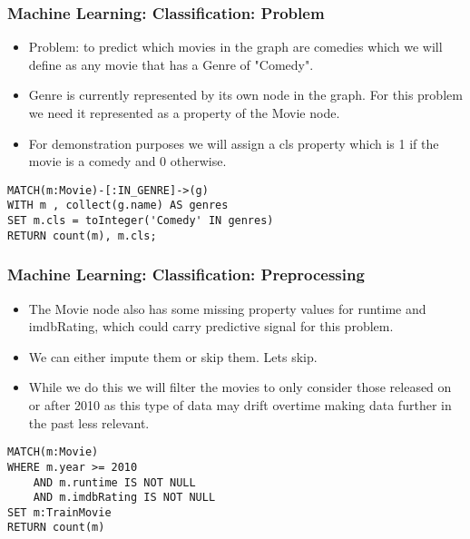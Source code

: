 \begin{frame}[fragile]\frametitle{Machine Learning: Classification: Problem}

\begin{itemize}
\item Problem: to predict which movies in the graph are comedies which we will define as any movie that has a Genre of "Comedy".
\item Genre is currently represented by its own node in the graph. For this problem we need it represented as a property of the Movie node. 
\item For demonstration purposes we will assign a cls property which is 1 if the movie is a comedy and 0 otherwise.
\end{itemize}

\begin{lstlisting}
MATCH(m:Movie)-[:IN_GENRE]->(g)
WITH m , collect(g.name) AS genres
SET m.cls = toInteger('Comedy' IN genres)
RETURN count(m), m.cls;
\end{lstlisting}
\end{frame}

\begin{frame}[fragile]\frametitle{Machine Learning: Classification: Preprocessing}

\begin{itemize}
\item The Movie node also has some missing property values for runtime and imdbRating, which could carry predictive signal for this problem.
\item We can either impute them or skip them. Lets skip.
\item While we do this we will filter the movies to only consider those released on or after 2010 as this type of data may drift overtime making data further in the past less relevant.
\end{itemize}

\begin{lstlisting}
MATCH(m:Movie)
WHERE m.year >= 2010
    AND m.runtime IS NOT NULL
    AND m.imdbRating IS NOT NULL
SET m:TrainMovie
RETURN count(m)
\end{lstlisting}
\end{frame}

